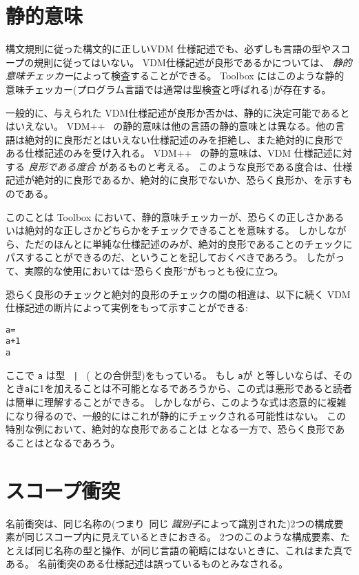 \documentclass[\pformat,12pt]{jarticle}
\newcommand{\vdmslpp}[2]{%
#2
}
\newcommand{\vdmsl}{VDM-SL}
\newcommand{\vdmpp}{VDM++}
\begin{document}
\section{静的意味}\label{static}

構文規則に従った構文的に正しいVDM 仕様記述でも、必ずしも言語の型やスコープの規則に従ってはいない。
VDM仕様記述が良形であるかについては、 {\em 静的意味チェッカー}によって検査することができる。
Toolbox にはこのような静的意味チェッカー(プログラム言語では通常は型検査と呼ばれる)が存在する。

一般的に、与えられた VDM仕様記述が良形か否かは、静的に決定可能であるとはいえない。
\vdmslpp{\vdmsl}{\vdmpp}\ の静的意味は他の言語の静的意味とは異なる。他の言語は絶対的に良形だとはいえない仕様記述のみを拒絶し、また絶対的に良形で
ある仕様記述のみを受け入れる。 
\vdmslpp{\vdmsl}{\vdmpp}\ の静的意味は、VDM 仕様記述に対する {\em 良形である度合} があるものと考える。
このような良形である度合は、仕様記述が絶対的に良形であるか、絶対的に良形でないか、恐らく良形か、を示すものである。

このことは Toolbox において、静的意味チェッカーが、恐らくの正しさかあるいは絶対的な正しさかどちらかをチェックできることを意味する。
しかしながら、ただのほんとに単純な仕様記述のみが、絶対的良形であることのチェックにパスすることができるのだ、ということを記しておくべきであろう。
したがって、実際的な使用においては``恐らく良形''がもっとも役に立つ。

恐らく良形のチェックと絶対的良形のチェックの間の相違は、以下に続く VDM 仕様記述の断片によって実例をもって示すことができる:
\begin{alltt}
    a =  
    a + 1 
     a
\end{alltt}
ここで {\tt a} は型 {\tt {} | } ( との合併型)をもっている。 
もし {\tt a}が  と等しいならば、そのとき{\tt a}に1を加えることは不可能となるであろうから、この式は悪形であると読者は簡単に理解することができる。
しかしながら、このような式は恣意的に複雑になり得るので、一般的にはこれが静的にチェックされる可能性はない。
この特別な例において、絶対的な良形であることは  となる一方で、恐らく良形であることはとなるであろう。

\section{スコープ衝突}
\label{sec:nameconflicts}

名前衝突は、同じ名称の(つまり\ 同じ {\em 識別子}によって識別された)2つの構成要素が同じスコープ内に見えているときにおきる。 
2つのこのような構成要素、たとえば同じ名称の型と操作、が同じ言語の範疇にはないときに、これはまた真である。
名前衝突のある仕様記述は誤っているものとみなされる。
\end{document}

